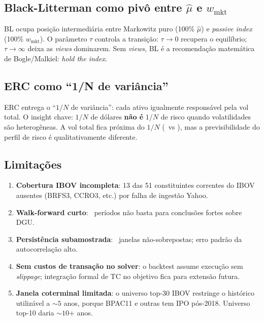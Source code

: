 \documentclass[12pt,a4paper,oneside]{article}
\begin{document}
\subsection{Black-Litterman como pivô entre $\hat{\mu}$ e $w_{\text{mkt}}$}

BL ocupa posição intermediária entre Markowitz puro (100\% $\hat{\mu}$)
e \textit{passive index} (100\% $w_{\text{mkt}}$). O parâmetro $\tau$
controla a transição: $\tau \to 0$ recupera o equilíbrio; $\tau \to
\infty$ deixa as \textit{views} dominarem. Sem \textit{views}, BL é
a recomendação matemática de Bogle/Malkiel: \textit{hold the index}.

\subsection{ERC como ``1/N de variância''}

ERC entrega o ``$1/N$ de variância'': cada ativo igualmente
responsável pela vol total. O insight chave: $1/N$ de dólares
\textbf{não é} $1/N$ de risco quando volatilidades são heterogêneas.
A vol total fica próxima do $1/N$ (\PaERCVol\ vs
\PaEqualWeightVol), mas a previsibilidade do perfil de risco é
qualitativamente diferente.

\subsection{Limitações}

\begin{enumerate}
\item \textbf{Cobertura IBOV incompleta}: 13 das 51 constituintes
correntes do IBOV ausentes (BRFS3, CCRO3, etc.) por falha de
ingestão Yahoo.
\item \textbf{Walk-forward curto}: \IngenuoPeriods\ períodos não basta
para conclusões fortes sobre DGU.
\item \textbf{Persistência subamostrada}: \PersistenceNWindows\ janelas
não-sobrepostas; erro padrão da autocorrelação alto.
\item \textbf{Sem custos de transação no solver}: o backtest assume
execução sem \textit{slippage}; integração formal de TC no objetivo
fica para extensão futura.
\item \textbf{Janela coterminal limitada}: o universo top-30 IBOV
restringe o histórico utilizável a $\sim 5$ anos, porque BPAC11 e
outras tem IPO pós-2018. Universo top-10 daria $\sim 10$+ anos.
\end{enumerate}

\end{document}
